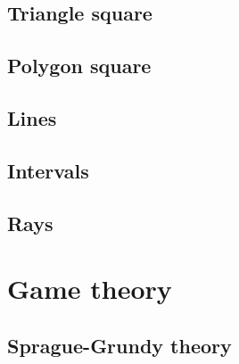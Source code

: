 \documentclass[12pt,a4paper]{article}
\begin{document}


\subsection{Triangle square}



\subsection{Polygon square}



\subsection{Lines}



\subsection{Intervals}



\subsection{Rays}



\section{Game theory}

\subsection{Sprague-Grundy theory}


\end{document}
